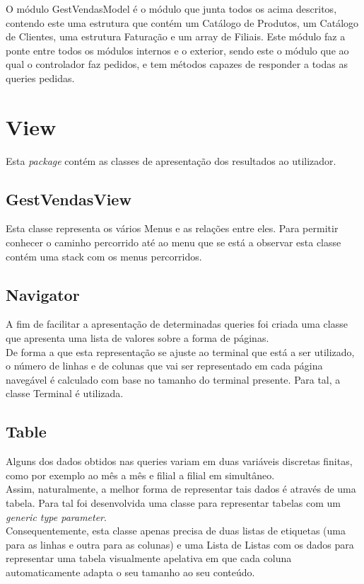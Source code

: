 \documentclass[a4paper]{report}
\begin{document}
O módulo GestVendasModel é o módulo que junta todos os acima descritos, 
contendo este uma estrutura
que contém um Catálogo de Produtos, um Catálogo de Clientes, uma estrutura Faturação e 
um array de Filiais. Este módulo faz a ponte entre todos os módulos internos e o 
exterior, sendo este o módulo que ao qual o controlador faz pedidos, e tem 
métodos capazes de responder a todas as queries pedidas.

\section{View}

Esta \textit{package} contém as classes de apresentação dos resultados ao utilizador.

\subsection{GestVendasView}

Esta classe representa os vários Menus e as relações entre eles. Para permitir
conhecer o caminho percorrido até ao menu que se está a observar esta classe
contém uma stack com os menus percorridos.

\subsection{Navigator}

A fim de facilitar a apresentação de determinadas queries foi criada uma classe que 
apresenta uma lista de valores sobre a forma de páginas.\\
De forma a que esta representação se ajuste ao terminal que está a ser utilizado, 
o número de linhas e de colunas que vai ser representado em cada página navegável 
é calculado com base no tamanho do terminal presente. Para tal, a classe Terminal 
é utilizada.

\subsection{Table}

Alguns dos dados obtidos nas queries variam em duas variáveis discretas finitas, como por exemplo
ao mês a mês e filial a filial em simultâneo.\\
Assim, naturalmente, a melhor forma de representar tais dados é através de uma tabela.
Para tal foi desenvolvida uma classe para representar tabelas com um 
\textit{generic type parameter}.\\
Consequentemente, esta classe apenas precisa de duas listas de etiquetas (uma 
para as linhas e outra para as colunas) e uma Lista de Listas com os dados para 
representar uma tabela visualmente apelativa em que cada coluna automaticamente 
adapta o seu tamanho ao seu conteúdo.
\end{document}
